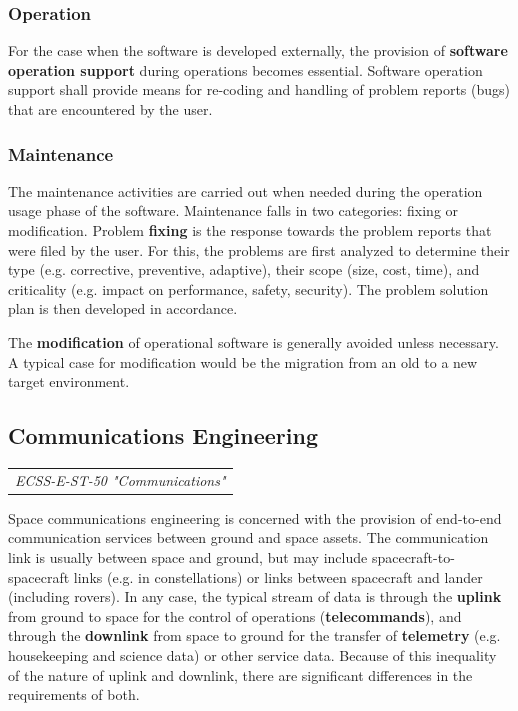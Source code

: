 \subsubsection{Operation}

For the case when the software is developed externally, the provision of \textbf{software operation support} during operations becomes essential. Software operation support shall provide means for re-coding and handling of problem reports (bugs) that are encountered by the user.

\subsubsection{Maintenance}

The maintenance activities are carried out when needed during the operation usage phase of the software. Maintenance falls in two categories: fixing or modification. Problem \textbf{fixing} is the response towards the problem reports that were filed by the user. For this, the problems are first analyzed to determine their type (e.g. corrective, preventive, adaptive), their scope (size, cost, time), and criticality (e.g. impact on performance, safety, security). The problem solution plan is then developed in accordance.

The \textbf{modification} of operational software is generally avoided unless necessary. A typical case for modification would be the migration from an old to a new target environment.

\subsection{Communications Engineering}

\begin{tabular}{l}
\textit{ECSS-E-ST-50 "Communications" \cite{ECSS-E-ST-50}}
\end{tabular}

Space communications engineering is concerned with the provision of end-to-end communication services between ground and space assets. The communication link is usually between space and ground, but may include spacecraft-to-spacecraft links (e.g. in constellations) or links between spacecraft and lander (including rovers). In any case, the typical stream of data is through the \textbf{uplink} from ground to space for the control of operations (\textbf{telecommands}), and through the \textbf{downlink} from space to ground for the transfer of \textbf{telemetry} (e.g. housekeeping and science data) or other service data. Because of this inequality of the nature of uplink and downlink, there are significant differences in the requirements of both.

